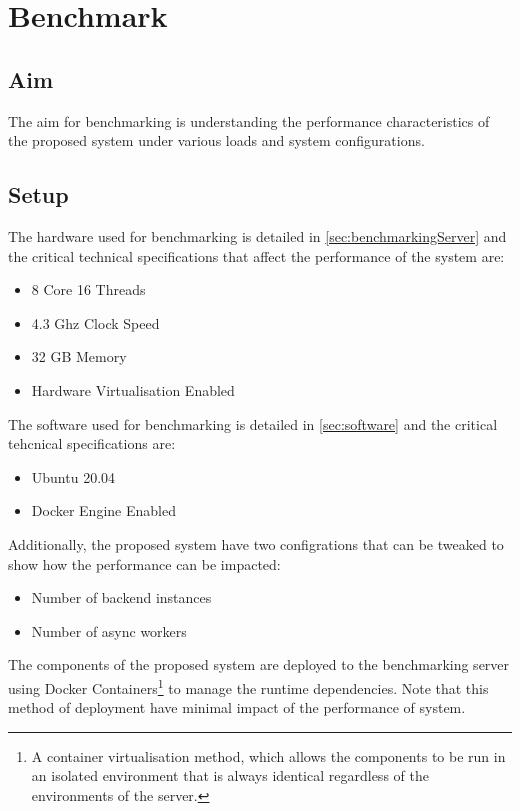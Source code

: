 \documentclass[../thesis.tex]{subfiles}
\begin{document}
\chapter{Benchmark}

\section{Aim}
The aim for benchmarking is understanding the performance characteristics of the proposed system under various loads and system configurations.

\section{Setup}

The hardware used for benchmarking is detailed in \autoref{sec:benchmarkingServer} and the critical technical specifications that affect the performance of the system are:
\begin{itemize}
	\item 8 Core 16 Threads
	\item 4.3 Ghz Clock Speed
	\item 32 GB Memory
	\item Hardware Virtualisation Enabled
\end{itemize}

The software used for benchmarking is detailed in \autoref{sec:software} and the critical tehcnical specifications are:
\begin{itemize}
	\item Ubuntu 20.04
	\item Docker Engine Enabled
\end{itemize}

Additionally, the proposed system have two configrations that can be tweaked to show how the performance can be impacted:

\begin{itemize}
	\item Number of backend instances
	\item Number of async workers
\end{itemize}

The components of the proposed system are deployed to the benchmarking server using Docker Containers\footnote{A container virtualisation method, which allows the components to be run in an isolated environment that is always identical regardless of the environments of the server.} to manage the runtime dependencies. Note that this method of deployment have minimal impact of the performance of system. 
\end{document}
